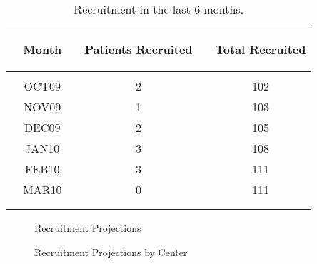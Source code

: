 \documentclass[dvips,10pt]{article}
\begin{document}
\begin{table}[t]
\caption
{ Recruitment in the last 6 months. }
\begin{center}
\begin{tabular}{ @{}l@{}
@{}c@{}@{}p{1.5em}@{}@{}c@{}@{}p{1.5em}@{}@{}c@{}
}
\hline

& \parbox{6em}{\begin{center}Month\end{center}} && \parbox{6em}{\begin{center}Patients Recruited\end{center}} && \parbox{6em}{\begin{center}Total Recruited\end{center}} \\

\hline

\\
& OCT09 && 2 && 102 \\
& NOV09 && 1 && 103 \\
& DEC09 && 2 && 105 \\
& JAN10 && 3 && 108 \\
& FEB10 && 3 && 111 \\
& MAR10 && 0 && 111 \\
\\
\hline \\

\end{tabular}

\end{center}
 \end{table}

\begin{figure}
\caption{Recruitment Projections}
\end{figure}

\begin{figure}
\caption{Recruitment Projections by Center}
\end{figure}
\clearpage
\end{document}
